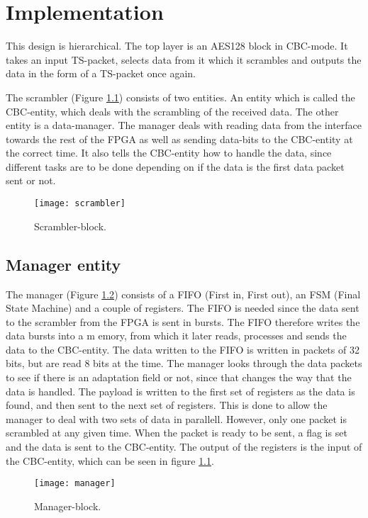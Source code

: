 \chapter{Implementation}
This design is hierarchical. The top layer is an AES128 block in 
CBC-mode. It takes an input TS-packet, selects data from it which it 
scrambles and outputs the data in the form of a TS-packet once 
again.

The scrambler (Figure \ref{block:scrambler}) consists of two entities. 
An entity which is called the CBC-entity, which deals with the 
scrambling of the received data. The other entity is a data-manager. 
The manager deals with reading data from the interface towards the 
rest of the FPGA as well as sending data-bits to the CBC-entity at the 
correct time. It also tells the CBC-entity how to handle the data, 
since different tasks are to be done depending on if the data is the 
first data packet sent or not.

\begin{figure}[h!]
  \centering
  \texttt{[image: scrambler]}
  \caption{Scrambler-block.}
  \label{block:scrambler}
\end{figure}

\section{Manager entity}
The manager (Figure \ref{block:manager}) consists of a FIFO (First in, 
First out), an FSM (Final State Machine) and a couple of registers. 
The FIFO is needed since the data sent to the scrambler from the FPGA 
is sent in bursts. The FIFO therefore writes the data bursts into a m
emory, from which it later reads, processes and sends the data to the 
CBC-entity. The data written to the FIFO is written in packets of 32 
bits, but are read 8 bits at the time. The manager looks through the 
data packets to see if there is an adaptation field or not, since that 
changes the way that the data is handled. The payload is written to 
the first set of registers as the data is found, and then sent to the 
next set of registers. This is done to allow the manager to deal with 
two sets of data in parallell. However, only one packet is scrambled 
at any given time. When the packet is ready to be sent, a flag is set 
and the data is sent to the CBC-entity. The output of the registers 
is the input of the CBC-entity, which can be seen in figure 
\ref{block:scrambler}.

\begin{figure}[h!]
  \centering
  \texttt{[image: manager]}
  \caption{Manager-block.}
  \label{block:manager}
\end{figure}

